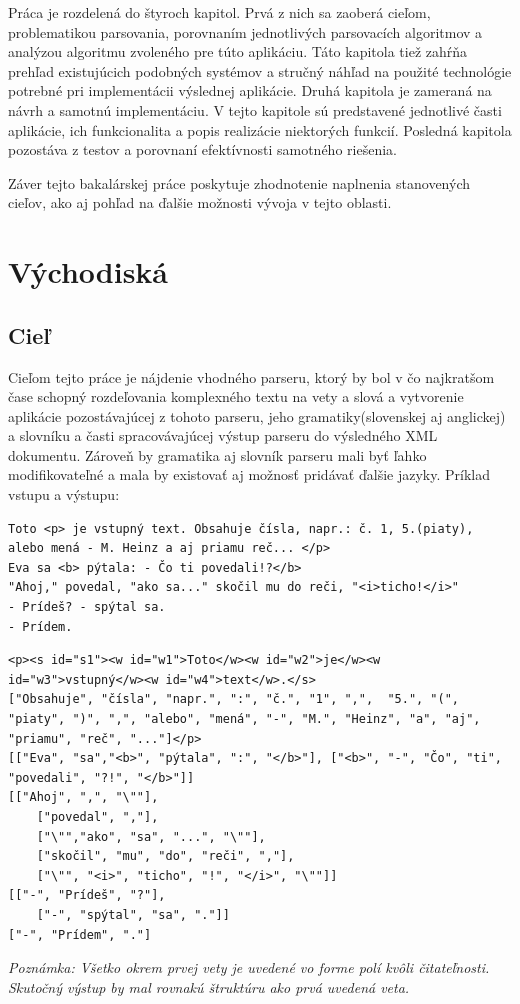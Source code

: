 \documentclass[12pt,a4paper]{report}
\theoremstyle{definition}
\theoremstyle{remark}
\begin{document}
Práca je rozdelená do štyroch kapitol. Prvá z nich sa zaoberá cieľom, problematikou parsovania, porovnaním jednotlivých parsovacích algoritmov a analýzou algoritmu zvoleného pre túto aplikáciu. Táto kapitola tiež zahŕňa prehľad existujúcich podobných systémov a stručný náhľad na použité technológie potrebné pri implementácii výslednej aplikácie. Druhá kapitola je zameraná na návrh a samotnú implementáciu. V tejto kapitole sú predstavené jednotlivé časti aplikácie, ich funkcionalita a popis realizácie niektorých funkcií. Posledná kapitola pozostáva z testov a porovnaní  efektívnosti samotného riešenia.
\bigskip


Záver tejto bakalárskej práce poskytuje zhodnotenie naplnenia stanovených cieľov, ako aj pohľad na ďalšie možnosti vývoja v tejto oblasti.

\chapter{Východiská}
\section{Cieľ}


Cieľom tejto práce je nájdenie vhodného parseru, ktorý by bol v čo najkratšom čase schopný rozdeľovania komplexného textu na vety a slová a vytvorenie aplikácie pozostávajúcej z tohoto parseru, jeho gramatiky(slovenskej aj anglickej) a slovníku a časti spracovávajúcej výstup parseru do výsledného XML dokumentu. Zároveň by gramatika aj slovník parseru mali byť ľahko modifikovateľné a mala by existovať aj možnosť pridávať ďalšie jazyky. Príklad vstupu a výstupu:
\begin{lstlisting}[caption={Vstup},style=htmlcssjs, label={lst:vstup}]
Toto <p> je vstupný text. Obsahuje čísla, napr.: č. 1, 5.(piaty), alebo mená - M. Heinz a aj priamu reč... </p>
Eva sa <b> pýtala: - Čo ti povedali!?</b>
"Ahoj," povedal, "ako sa..." skočil mu do reči, "<i>ticho!</i>"
- Prídeš? - spýtal sa.
- Prídem.
\end{lstlisting}
\begin{lstlisting}[caption={Výstup},style=htmlcssjs, label={lst:vystup}]
<p><s id="s1"><w id="w1">Toto</w><w id="w2">je</w><w id="w3">vstupný</w><w id="w4">text</w>.</s>
["Obsahuje", "čísla", "napr.", ":", "č.", "1", ",",  "5.", "(", "piaty", ")", ",", "alebo", "mená", "-", "M.", "Heinz", "a", "aj", "priamu", "reč", "..."]</p>
[["Eva", "sa","<b>", "pýtala", ":", "</b>"], ["<b>", "-", "Čo", "ti", "povedali", "?!", "</b>"]]
[["Ahoj", ",", "\""],
	["povedal", ","],
	["\"","ako", "sa", "...", "\""],
	["skočil", "mu", "do", "reči", ","],
	["\"", "<i>", "ticho", "!", "</i>", "\""]]
[["-", "Prídeš", "?"],
	["-", "spýtal", "sa", "."]]
["-", "Prídem", "."]
\end{lstlisting}
\noindent \textit{Poznámka: Všetko okrem prvej vety je uvedené vo forme polí kvôli čitateľnosti. Skutočný výstup by mal rovnakú štruktúru ako prvá uvedená veta.}
\end{document}
